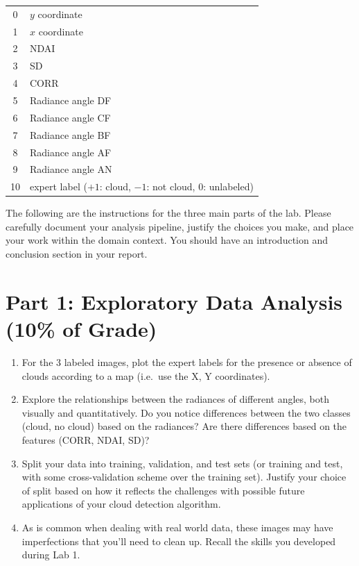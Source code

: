 \documentclass[letterpaper,12pt]{article}
\begin{document}
{\centering
\begin{tabular}{c|l}
    0 & $y$ coordinate \\
    1 & $x$ coordinate \\
    2 & NDAI \\
    3 & SD \\
    4 & CORR \\
    5 & Radiance angle DF \\
    6 & Radiance angle CF \\
    7 & Radiance angle BF \\
    8 & Radiance angle AF \\
    9 & Radiance angle AN \\\hline
    10 & expert label ($+1$: cloud, $-1$: not cloud, $0$: unlabeled) \\
\end{tabular}\par
}

The following are the instructions for the three main parts of the lab. Please carefully document your analysis pipeline, justify the choices you make, and place your work within the domain context. You should have an introduction and conclusion section in your report.

\section*{Part 1: Exploratory Data Analysis (10\% of Grade)}
\begin{enumerate}
    \item For the 3 labeled images, plot the expert labels for the presence or absence of clouds according to a map (i.e.~use the X, Y coordinates).
    \item Explore the relationships between the radiances of different angles, both visually and quantitatively. Do you notice differences between the two classes (cloud, no cloud) based on the radiances? Are there differences based on the features (CORR, NDAI, SD)?
    \item Split your data into training, validation, and test sets (or training and test, with some cross-validation scheme over the training set). Justify your choice of split based on how it reflects the challenges with possible future applications of your cloud detection algorithm.
    \item As is common when dealing with real world data, these images may have imperfections that you'll need to clean up. Recall the skills you developed during Lab 1.
\end{enumerate}
\end{document}

